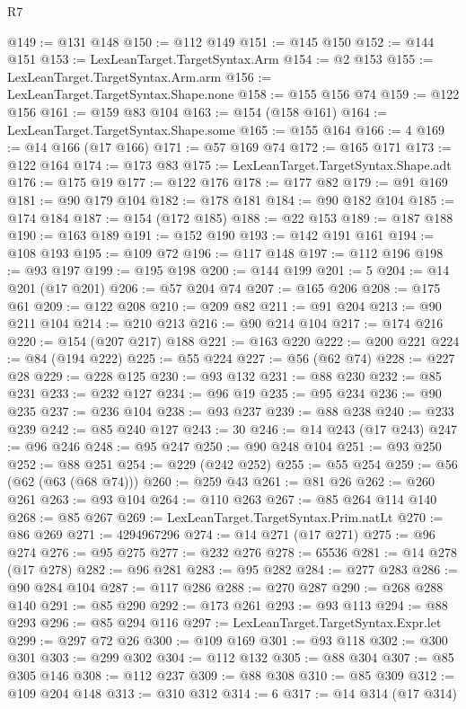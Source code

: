 \begin{lexlean}{R7}
\begin{coremodule}
@149 := @131 @148
@150 := @112 @149
@151 := @145 @150
@152 := @144 @151
@153 := LexLeanTarget.TargetSyntax.Arm
@154 := @2 @153
@155 := LexLeanTarget.TargetSyntax.Arm.arm
@156 := LexLeanTarget.TargetSyntax.Shape.none
@158 := @155 @156 @74
@159 := @122 @156
@161 := @159 @83 @104
@163 := @154 (@158 @161)
@164 := LexLeanTarget.TargetSyntax.Shape.some
@165 := @155 @164
@166 := 4
@169 := @14 @166 (@17 @166)
@171 := @57 @169 @74
@172 := @165 @171
@173 := @122 @164
@174 := @173 @83
@175 := LexLeanTarget.TargetSyntax.Shape.adt
@176 := @175 @19
@177 := @122 @176
@178 := @177 @82
@179 := @91 @169
@181 := @90 @179 @104
@182 := @178 @181
@184 := @90 @182 @104
@185 := @174 @184
@187 := @154 (@172 @185)
@188 := @22 @153
@189 := @187 @188
@190 := @163 @189
@191 := @152 @190
@193 := @142 @191 @161
@194 := @108 @193
@195 := @109 @72
@196 := @117 @148
@197 := @112 @196
@198 := @93 @197
@199 := @195 @198
@200 := @144 @199
@201 := 5
@204 := @14 @201 (@17 @201)
@206 := @57 @204 @74
@207 := @165 @206
@208 := @175 @61
@209 := @122 @208
@210 := @209 @82
@211 := @91 @204
@213 := @90 @211 @104
@214 := @210 @213
@216 := @90 @214 @104
@217 := @174 @216
@220 := @154 (@207 @217) @188
@221 := @163 @220
@222 := @200 @221
@224 := @84 (@194 @222)
@225 := @55 @224
@227 := @56 (@62 @74)
@228 := @227 @28
@229 := @228 @125
@230 := @93 @132
@231 := @88 @230
@232 := @85 @231
@233 := @232 @127
@234 := @96 @19
@235 := @95 @234
@236 := @90 @235
@237 := @236 @104
@238 := @93 @237
@239 := @88 @238
@240 := @233 @239
@242 := @85 @240 @127
@243 := 30
@246 := @14 @243 (@17 @243)
@247 := @96 @246
@248 := @95 @247
@250 := @90 @248 @104
@251 := @93 @250
@252 := @88 @251
@254 := @229 (@242 @252)
@255 := @55 @254
@259 := @56 (@62 (@63 (@68 @74)))
@260 := @259 @43
@261 := @81 @26
@262 := @260 @261
@263 := @93 @104
@264 := @110 @263
@267 := @85 @264 @114 @140
@268 := @85 @267
@269 := LexLeanTarget.TargetSyntax.Prim.natLt
@270 := @86 @269
@271 := 4294967296
@274 := @14 @271 (@17 @271)
@275 := @96 @274
@276 := @95 @275
@277 := @232 @276
@278 := 65536
@281 := @14 @278 (@17 @278)
@282 := @96 @281
@283 := @95 @282
@284 := @277 @283
@286 := @90 @284 @104
@287 := @117 @286
@288 := @270 @287
@290 := @268 @288 @140
@291 := @85 @290
@292 := @173 @261
@293 := @93 @113
@294 := @88 @293
@296 := @85 @294 @116
@297 := LexLeanTarget.TargetSyntax.Expr.let
@299 := @297 @72 @26
@300 := @109 @169
@301 := @93 @118
@302 := @300 @301
@303 := @299 @302
@304 := @112 @132
@305 := @88 @304
@307 := @85 @305 @146
@308 := @112 @237
@309 := @88 @308
@310 := @85 @309
@312 := @109 @204 @148
@313 := @310 @312
@314 := 6
@317 := @14 @314 (@17 @314)

\end{coremodule}
\end{lexlean}

